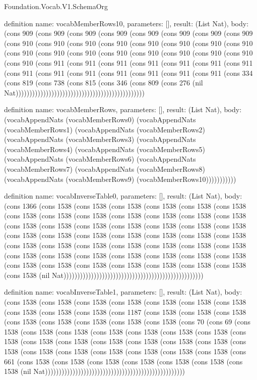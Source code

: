 \begin{lexlean}{Foundation.Vocab.V1.SchemaOrg}
\begin{semanticmodule}
definition{
  name: vocabMemberRows10,
  parameters: [],
  result: (List Nat),
  body: (cons 909 (cons 909 (cons 909 (cons 909 (cons 909 (cons 909 (cons 909 (cons 909 (cons 910 (cons 910 (cons 910 (cons 910 (cons 910 (cons 910 (cons 910 (cons 910 (cons 910 (cons 910 (cons 910 (cons 910 (cons 910 (cons 910 (cons 910 (cons 910 (cons 910 (cons 911 (cons 911 (cons 911 (cons 911 (cons 911 (cons 911 (cons 911 (cons 911 (cons 911 (cons 911 (cons 911 (cons 911 (cons 911 (cons 911 (cons 334 (cons 819 (cons 738 (cons 815 (cons 346 (cons 809 (cons 276 (nil Nat)))))))))))))))))))))))))))))))))))))))))))))))
}

definition{
  name: vocabMemberRows,
  parameters: [],
  result: (List Nat),
  body: (vocabAppendNats (vocabMemberRows0) (vocabAppendNats (vocabMemberRows1) (vocabAppendNats (vocabMemberRows2) (vocabAppendNats (vocabMemberRows3) (vocabAppendNats (vocabMemberRows4) (vocabAppendNats (vocabMemberRows5) (vocabAppendNats (vocabMemberRows6) (vocabAppendNats (vocabMemberRows7) (vocabAppendNats (vocabMemberRows8) (vocabAppendNats (vocabMemberRows9) (vocabMemberRows10)))))))))))
}

definition{
  name: vocabInverseTable0,
  parameters: [],
  result: (List Nat),
  body: (cons 1366 (cons 1538 (cons 1538 (cons 1538 (cons 1538 (cons 1538 (cons 1538 (cons 1538 (cons 1538 (cons 1538 (cons 1538 (cons 1538 (cons 1538 (cons 1538 (cons 1538 (cons 1538 (cons 1538 (cons 1538 (cons 1538 (cons 1538 (cons 1538 (cons 1538 (cons 1538 (cons 1538 (cons 1538 (cons 1538 (cons 1538 (cons 1538 (cons 1538 (cons 1538 (cons 1538 (cons 1538 (cons 1538 (cons 1538 (cons 1538 (cons 1538 (cons 1538 (cons 1538 (cons 1538 (cons 1538 (cons 1538 (cons 1538 (cons 1538 (cons 1538 (cons 1538 (cons 1538 (cons 1538 (cons 1538 (cons 1538 (cons 1538 (nil Nat)))))))))))))))))))))))))))))))))))))))))))))))))))
}

definition{
  name: vocabInverseTable1,
  parameters: [],
  result: (List Nat),
  body: (cons 1538 (cons 1538 (cons 1538 (cons 1538 (cons 1538 (cons 1538 (cons 1538 (cons 1538 (cons 1538 (cons 1538 (cons 1187 (cons 1538 (cons 1538 (cons 1538 (cons 1538 (cons 1538 (cons 1538 (cons 1538 (cons 1538 (cons 70 (cons 69 (cons 1538 (cons 1538 (cons 1538 (cons 1538 (cons 1538 (cons 1538 (cons 1538 (cons 1538 (cons 1538 (cons 1538 (cons 1538 (cons 1538 (cons 1538 (cons 1538 (cons 1538 (cons 1538 (cons 1538 (cons 1538 (cons 1538 (cons 1538 (cons 1538 (cons 661 (cons 1538 (cons 1538 (cons 1538 (cons 1538 (cons 1538 (cons 1538 (cons 1538 (nil Nat)))))))))))))))))))))))))))))))))))))))))))))))))))
}


\end{semanticmodule}
\end{lexlean}
